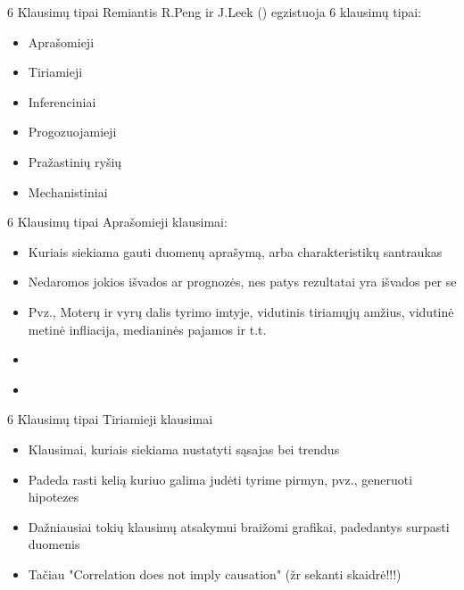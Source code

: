 \documentclass[11pt,xcolor=table]{beamer}
\begin{document}
\begin{frame}{6 Klausimų tipai}
Remiantis R.Peng ir J.Leek (\href{www.sciencemag.org/content/347/6228/1314.short}{\color{blue}{Science 2015}}) egzistuoja 6 klausimų tipai:
\begin{itemize}
\item Aprašomieji
\item Tiriamieji
\item Inferenciniai
\item Progozuojamieji
\item Pražastinių ryšių
\item Mechanistiniai
\end{itemize}
\end{frame}
\begin{frame}{6 Klausimų tipai}
Aprašomieji klausimai:
\begin{itemize}
\item Kuriais siekiama gauti duomenų aprašymą, arba charakteristikų santraukas
\item Nedaromos jokios išvados ar prognozės, nes patys rezultatai yra išvados per se
\item Pvz., Moterų ir vyrų dalis tyrimo imtyje, vidutinis tiriamųjų amžius, vidutinė metinė infliacija, medianinės pajamos ir t.t.
\item \href{https://osp.stat.gov.lt/pagrindiniai-salies-rodikliai}{\color{blue}{LSD šalies rodikliai}}
\item \href{https://osp.stat.gov.lt/statistika-vizualiai}{\color{blue}{LSD statistika vizualiai}}
\end{itemize}
\end{frame}


\begin{frame}{6 Klausimų tipai}
Tiriamieji klausimai
\begin{itemize}
\item Klausimai, kuriais siekiama nustatyti sąsajas bei trendus
\item Padeda rasti kelią kuriuo galima judėti tyrime pirmyn, pvz., generuoti hipotezes
\item Dažniausiai tokių klausimų atsakymui braižomi grafikai, padedantys surpasti duomenis
\item Tačiau "Correlation does not imply causation" (žr sekanti skaidrė!!!)
\end{itemize}
\end{frame}
\end{document}
